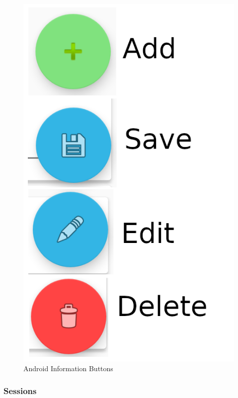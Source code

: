 \documentclass[11pt]{article}
\begin{document}
\begin{figure}
 \centering
 \includegraphics[width=12cm, keepaspectratio]{Images/AndroidInformationButtons.png}
 \caption{Android Information Buttons}
 \label{Android Information Buttons}
\end{figure}

\subsubsection{Sessions}
\label{Mobile Sessions}
\end{document}
